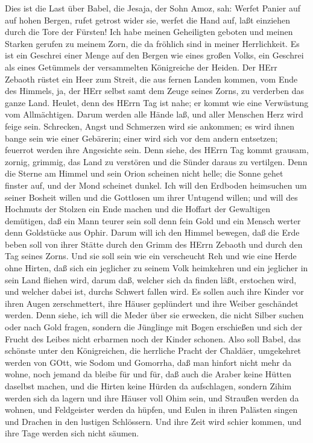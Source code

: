  Dies ist die Last über Babel, die Jesaja, der Sohn Amoz,
sah:  Werfet Panier auf auf hohen Bergen, rufet getrost
wider sie, werfet die Hand auf, laßt einziehen durch die Tore der
Fürsten!  Ich habe meinen Geheiligten geboten und meinen
Starken gerufen zu meinem Zorn, die da fröhlich sind in meiner
Herrlichkeit.  Es ist ein Geschrei einer Menge auf den
Bergen wie eines großen Volks, ein Geschrei als eines Getümmels der
versammelten Königreiche der Heiden. Der HErr Zebaoth rüstet ein Heer
zum Streit,  die aus fernen Landen kommen, vom Ende des
Himmels, ja, der HErr selbst samt dem Zeuge seines Zorns, zu verderben
das ganze Land.  Heulet, denn des HErrn Tag ist nahe; er
kommt wie eine Verwüstung vom Allmächtigen.  Darum werden
alle Hände laß, und aller Menschen Herz wird feige sein. 
Schrecken, Angst und Schmerzen wird sie ankommen; es wird ihnen bange
sein wie einer Gebärerin; einer wird sich vor dem andern entsetzen;
feuerrot werden ihre Angesichte sein.  Denn siehe, des HErrn
Tag kommt grausam, zornig, grimmig, das Land zu verstören und die Sünder
daraus zu vertilgen.  Denn die Sterne am Himmel und sein
Orion scheinen nicht helle; die Sonne gehet finster auf, und der Mond
scheinet dunkel.  Ich will den Erdboden heimsuchen um
seiner Bosheit willen und die Gottlosen um ihrer Untugend willen; und
will des Hochmuts der Stolzen ein Ende machen und die Hoffart der
Gewaltigen demütigen,  daß ein Mann teurer sein soll denn
fein Gold und ein Mensch werter denn Goldstücke aus Ophir. 
Darum will ich den Himmel bewegen, daß die Erde beben soll von ihrer
Stätte durch den Grimm des HErrn Zebaoth und durch den Tag seines Zorns.
 Und sie soll sein wie ein verscheucht Reh und wie eine
Herde ohne Hirten, daß sich ein jeglicher zu seinem Volk heimkehren und
ein jeglicher in sein Land fliehen wird,  darum daß,
welcher sich da finden läßt, erstochen wird, und welcher dabei ist,
durchs Schwert fallen wird.  Es sollen auch ihre Kinder vor
ihren Augen zerschmettert, ihre Häuser geplündert und ihre Weiber
geschändet werden.  Denn siehe, ich will die Meder über sie
erwecken, die nicht Silber suchen oder nach Gold fragen, 
sondern die Jünglinge mit Bogen erschießen und sich der Frucht des
Leibes nicht erbarmen noch der Kinder schonen.  Also soll
Babel, das schönste unter den Königreichen, die herrliche Pracht der
Chaldäer, umgekehret werden von GOtt, wie Sodom und Gomorrha,
 daß man hinfort nicht mehr da wohne, noch jemand da bleibe
für und für, daß auch die Araber keine Hütten daselbst machen, und die
Hirten keine Hürden da aufschlagen,  sondern Zihim werden
sich da lagern und ihre Häuser voll Ohim sein, und Straußen werden da
wohnen, und Feldgeister werden da hüpfen,  und Eulen in
ihren Palästen singen und Drachen in den lustigen Schlössern. Und ihre
Zeit wird schier kommen, und ihre Tage werden sich nicht säumen.

